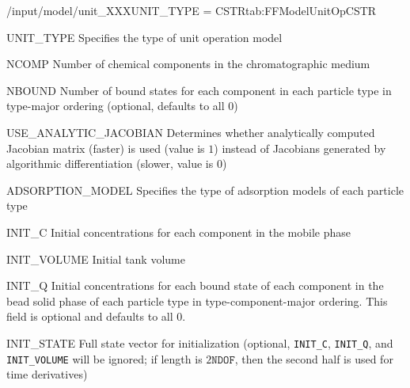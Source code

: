 \begin{condsubgroup}{/input/model/unit\_XXX}{UNIT\_TYPE = CSTR}{tab:FFModelUnitOpCSTR}
  \begin{dataset}[type=string,range={\texttt{CSTR}},length=1]{UNIT\_TYPE}
    Specifies the type of unit operation model
  \end{dataset}
  \begin{dataset}[type=int,range={$\geq 1$},length=1]{NCOMP}
    Number of chemical components in the chromatographic medium
  \end{dataset}
  \begin{dataset}[type=int,range={$\geq 0$},length={$\texttt{NPARTYPE} \cdot \texttt{NCOMP}$}]{NBOUND}
    Number of bound states for each component in each particle type in type-major ordering (optional, defaults to all $0$)
  \end{dataset}
  \begin{dataset}[type=int,range={$\{0, 1\}$},length=1]{USE\_ANALYTIC\_JACOBIAN}
    Determines whether analytically computed Jacobian matrix (faster) is used (value is $1$) instead of Jacobians generated by algorithmic differentiation (slower, value is $0$)
  \end{dataset}
  \begin{dataset}[type=string,range={See Section~\ref{sec:FFAdsorption}},length={\texttt{NPARTYPE}}]{ADSORPTION\_MODEL}
    Specifies the type of adsorption models of each particle type
  \end{dataset}
  \begin{dataset}[unit=\si{\mol\per\cubic\metre\of{IV}},type=double,range={$\geq 0$},length={\texttt{NCOMP}}]{INIT\_C}
    Initial concentrations for each component in the mobile phase
  \end{dataset}
  \begin{dataset}[unit=\si{\cubic\metre},type=double,range={$\geq 0$},length=1]{INIT\_VOLUME}
    Initial tank volume
  \end{dataset}
  \begin{dataset}[unit=\si{\mol\per\cubic\metre\of{SP}},type=double,range={$\geq 0$},length={\texttt{NTOTALBND}}]{INIT\_Q}
    Initial concentrations for each bound state of each component in the bead solid phase of each particle type in type-component-major ordering.
    This field is optional and defaults to all $0$.
  \end{dataset}
  \begin{dataset}[unit=various,type=double,range={$\mathds{R}$},length={\texttt{NDOF} / $2\texttt{NDOF}$}]{INIT\_STATE}
    Full state vector for initialization (optional, \texttt{INIT\_C}, \texttt{INIT\_Q}, and \texttt{INIT\_VOLUME} will be ignored; if length is $2\texttt{NDOF}$, then the second half is used for time derivatives)

\end{dataset}
\end{condsubgroup}
